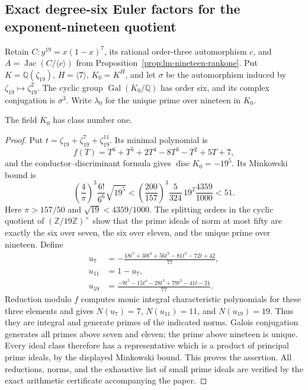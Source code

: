 \subsection{Exact degree-six Euler factors for the exponent-nineteen quotient}
\label{subsec:nineteen-euler}

Retain $C:y^{19}=x(1-x)^7$, its rational order-three automorphism
$c$, and $A=\operatorname{Jac}(C/\langle c\rangle)$ from
Proposition~\ref{prop:lm-nineteen-rankone}.  Put
$K=\mathbb Q(\zeta_{19})$, $H=\langle7\rangle$,
$K_0=K^H$, and let $\sigma$ be the automorphism induced by
$\zeta_{19}\mapsto\zeta_{19}^2$.  The cyclic group
$\operatorname{Gal}(K_0/\mathbb Q)$ has order six, and its
complex conjugation is $\sigma^3$.  Write $\lambda_0$ for the
unique prime over nineteen in $K_0$.

\begin{lemma}\label{lem:nineteen-class-one}
The field $K_0$ has class number one.
\end{lemma}
\begin{proof}
Put $t=\zeta_{19}+\zeta_{19}^7+\zeta_{19}^{11}$. Its minimal
polynomial is
\[
 f(T)=T^6+T^5+2T^4-8T^3-T^2+5T+7,
\]
and the conductor--discriminant formula gives
$\operatorname{disc}K_0=-19^5$. Its Minkowski bound is
\[
 \left(\frac4\pi\right)^3\frac{6!}{6^6}\sqrt{19^5}
 <\left(\frac{200}{157}\right)^3\frac5{324}\,19^2
       \frac{4359}{1000}<51.
\]
Here $\pi>157/50$ and $\sqrt{19}<4359/1000$. The splitting
orders in the cyclic quotient of $(\mathbb Z/19\mathbb Z)^\times$
show that the prime ideals of norm at most fifty are exactly the
six over seven, the six over eleven, and the unique prime over
nineteen. Define
\[
\begin{split}
 u_7&=-\frac{18t^5+30t^4+56t^3-81t^2-72t+42}{77},\\
 u_{11}&=1-u_7,\\
 u_{19}&=\frac{-9t^5-15t^4-28t^3+79t^2-41t-21}{77}.
\end{split}
\]
Reduction modulo $f$ computes monic integral characteristic
polynomials for these three elements and gives
$N(u_7)=7$, $N(u_{11})=11$, and $N(u_{19})=19$.
Thus they are integral and generate primes of the indicated norms.
Galois conjugation generates all primes above seven and eleven;
the prime above nineteen is unique. Every ideal class therefore has
a representative which is a product of principal prime ideals,
by the displayed Minkowski bound. This proves the assertion.
All reductions, norms, and the exhaustive list of small prime ideals
are verified by the exact arithmetic certificate accompanying the paper.
\end{proof}

